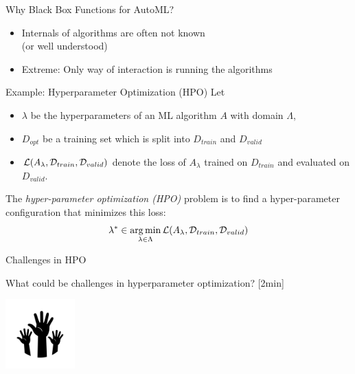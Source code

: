 \begin{frame}[c]{Why Black Box Functions for AutoML?}

\begin{itemize}
  \item Internals of algorithms are often not known\\
  (or well understood)
  \item Extreme: Only way of interaction is running the algorithms
\end{itemize}

\pause
\begin{block}{Example: Hyperparameter Optimization (HPO)}
	Let 
	\begin{itemize}
		\item $\lambda$ be the hyperparameters of an ML algorithm $A$ with domain $\Lambda$,
		\item $D_{opt}$ be a training set which is split into $D_{train}$ and $D_{valid}$ 
		\item $\mathcal{L}(A_{\mathbf{\lambda}}, \mathcal{D}_{train}, \mathcal{D}_{valid})$ denote the loss of $A_\lambda$ trained on $D_{train}$ and evaluated on $D_{valid}$.
	\end{itemize}
	The \emph{hyper-parameter optimization (HPO)} problem is to find a hyper-parameter configuration that minimizes this loss:
	\begin{equation}
	\lambda^* \in \operatorname*{arg\,min}_{\lambda \in \Lambda} \mathcal{L}(A_{\mathbf{\lambda}}, \mathcal{D}_{train}, \mathcal{D}_{valid}) \nonumber  
	\end{equation}
\end{block}

\end{frame}
\begin{frame}[c]{Challenges in HPO}
{%
	\centering
	
	
	What could be challenges in hyperparameter optimization? [2min]
	
	\bigskip
	
	\includegraphics[width=0.2\textwidth]{images/hands.png}
}%

\end{frame}
